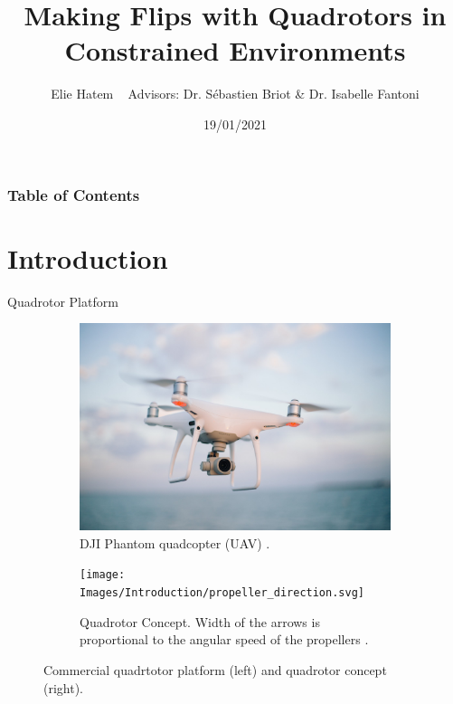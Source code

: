 \documentclass{thesisbeamer}
\title[Making Flips with Quadrotors in Constrained Environments]{Making Flips with Quadrotors in Constrained Environments}
\author[Elie Hatem]{Elie Hatem \newline ~ \newline \normalsize{Advisors: Dr. Sébastien Briot \& Dr. Isabelle Fantoni}}
\date{19/01/2021}
\begin{document}
\MakeTitleNoFoot




    \begin{frame}[allowframebreaks]
        \frametitle{Table of Contents}
        \tableofcontents
    \end{frame}


\section{Introduction}

\begin{frame}[t]{Quadrotor Platform} \vspace{4pt}


\begin{figure}[t]
     \centering
     \begin{subfigure}[b]{0.45\textwidth}
         \centering
         \includegraphics[width=\textwidth]{Images/Introduction/drone}
         \caption[Caption for LOF]{DJI Phantom quadcopter (UAV) \cite{DJIPhantom}.}
         \label{fig:drone}
     \end{subfigure}
     \hfill
     \begin{subfigure}[b]{0.45\textwidth}
         \centering
         \texttt{[image: Images/Introduction/propeller\_direction.svg]}
         \caption{Quadrotor Concept. Width of the arrows is proportional to the angular speed of the propellers \cite{Bouabdalla2007}.}
         \label{fig:propeller_directions}
     \end{subfigure}
        \caption{Commercial quadrtotor platform (left) and quadrotor concept (right).}
        \label{fig:three graphs}
\end{figure}

\end{frame}
\end{document}
